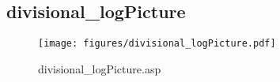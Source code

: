 \subsection{divisional\_logPicture}
\begin{figure}[htb]
    \begin{center}
        \texttt{[image: figures/divisional\_logPicture.pdf]}
    \end{center}
    \caption{divisional\_logPicture.asp}
    \label{fig:divisional_logPicture}
\end{figure}
